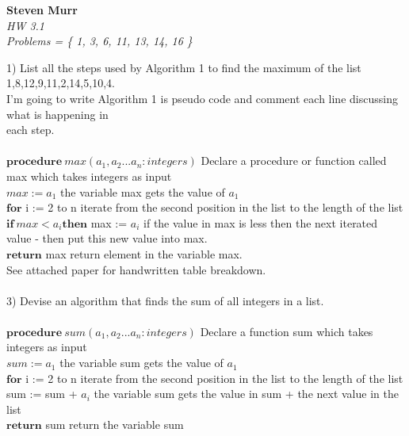 \documentclass{article}
\begin{document}
\setcounter{totalnumber}{5}
   \begin{flushright}
      \Large\textbf{Steven Murr}\\
      \large\textit{HW 3.1} \\
      \large\textit{Problems = \{ 1, 3, 6, 11, 13, 14, 16 \}} \\
   \end{flushright}
\begin{flushleft}
\makeatletter%
\setlength{\@fptop}{5pt}
\makeatother
\setlength\parindent{0pt}1) List all the steps used by Algorithm 1 to find the maximum of the list 1,8,12,9,11,2,14,5,10,4. \\
\setlength\parindent{24pt} I'm going to write Algorithm 1 is pseudo code and comment each line discussing what is happening in \\each step. \\
~\\
$\textbf{procedure} \: max(a_1, a_2 . . . a_n: integers)$ {\tiny Declare a procedure or function called max which takes integers as input} \\
$\textit{max} := a_1$ {\tiny the variable max gets the value of $a_1$}\\
$\textbf{for}$ i := 2 to n {\tiny iterate from the second position in the list to the length of the list} \\
\setlength\parindent{48pt} $\textbf{if} \:max < a_i \textbf{then}$ max := $a_i$ {\tiny if the value in max is less then the next iterated value - then put this new value into max.} \\
\setlength\parindent{24pt}$\textbf{return}$ max {\tiny return element in the variable max.} \\
{\tiny *See attached paper for handwritten table breakdown.} \\

~\\
\setlength\parindent{0pt}3) Devise an algorithm that finds the sum of all integers in a list. \\
~\\
\setlength\parindent{24pt}$\textbf{procedure} \: sum(a_1, a_2 . . . a_n: integers)$ {\tiny Declare a function sum which takes integers as input} \\
$\textit{sum} := a_1$ {\tiny the variable sum gets the value of $a_1$}\\
$\textbf{for}$ i := 2 to n {\tiny iterate from the second position in the list to the length of the list} \\
\setlength\parindent{48pt} sum := sum + $a_i$  {\tiny the variable sum gets the value in sum + the next value in the list}\\
\setlength\parindent{24pt}$\textbf{return}$ sum {\tiny return the variable sum} \\
~\\


\end{flushleft}
\end{document}
